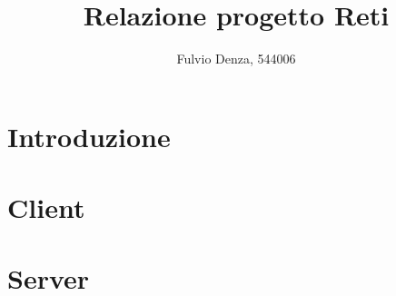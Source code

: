 \documentclass{article}
\title{Relazione progetto Reti}
\author{Fulvio Denza, 544006}
\begin{document}
	\maketitle
	\section{Introduzione}
	\section{Client}
	\section{Server}
\end{document}
